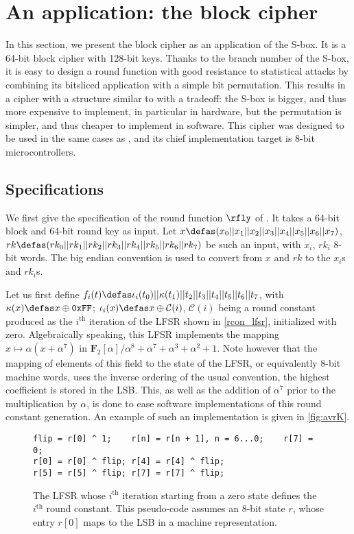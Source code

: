 \section{An application: the \littlunpride block cipher}
\label{sec:fly}

In this section, we present the \fly block cipher as an application of the \littlunOne S-box. It is a 64-bit
block cipher with 128-bit keys.
Thanks to the branch
number of the S-box, it is easy to design a round function with good resistance to statistical attacks by combining
its bitsliced application with a simple bit permutation. This results in a cipher with a structure similar to \present \cite{present}
with a tradeoff: the S-box is bigger, and thus more expensive to implement, in particular in hardware, but the
permutation is simpler, and thus cheaper to implement in software.
This cipher was designed to be used in the same cases as \pride, and its chief implementation target is 8-bit microcontrollers.

\subsection{Specifications}

We first give the specification of the round function $\rfly$ of \fly. It takes a 64-bit block and 64-bit round key as input.
Let $x \defas (x_0||x_1||x_2||x_3||x_4||x_5||x_6||x_7)$, $rk \defas (rk_0||rk_1||rk_2||rk_3||rk_4||rk_5||rk_6|| rk_7)$ be such
an input, with $x_i$, $rk_i$ 8-bit words. The big endian convention is used to convert from $x$ and $rk$ to the $x_i$s and $rk_i$s.

Let us first define $f_i(t) \defas \iota_i(t_0)||\kappa(t_1)||t_2||t_3||t_4||t_5||t_6||t_7$, with $\kappa(x) \defas x \oplus \texttt{0xFF}$;
$\iota_i(x) \defas x \oplus \mathcal{C}(i)$,
$\mathcal{C}(i)$ being a round constant produced as the $i^\text{th}$ iteration of the LFSR shown in
\autoref{rcon_lfsr}, initialized with zero. Algebraically speaking, this LFSR implements the mapping $x \mapsto \alpha(x + \alpha^7)$
in $\mathbf{F}_2[\alpha]/\alpha^8+\alpha^7+\alpha^3+\alpha^2+1$. Note however that the mapping of elements of this field to the state of the
LFSR, or equivalently 8-bit machine words, uses the inverse ordering of the usual convention, \ie{} the highest coefficient is
stored in the LSB. This, as well as the addition of $\alpha^7$ prior to the multiplication by $\alpha$, is done to ease software implementations
of this round constant generation. An example of such an implementation is given in 
\autoref{fig:avrK}.
\begin{figure}[ht]
\begin{verbatim}
flip = r[0] ^ 1;    r[n] = r[n + 1], n = 6...0;    r[7] = 0;
r[0] = r[0] ^ flip; r[4] = r[4] ^ flip;
r[5] = r[5] ^ flip; r[7] = r[7] ^ flip;
\end{verbatim}
\caption[The round-constant-generating LFSR.]{The LFSR whose $i^\text{th}$ iteration starting from a zero state defines the $i^\text{th}$ round constant. This pseudo-code
assumes an 8-bit state $r$, whose entry $r[0]$ maps to the LSB in a machine representation\label{rcon_lfsr}.}
\end{figure}

